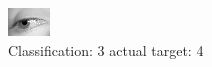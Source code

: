 \begin{figure}[h!]
\begin{center}
\includegraphics[width=0.60\columnwidth]{figures/ID2962_class_3_target_4.png}
\end{center}
\caption{ Classification: 3 actual target: 4}
\label{fig:ID2962_class_3_target_4}
\end{figure}
